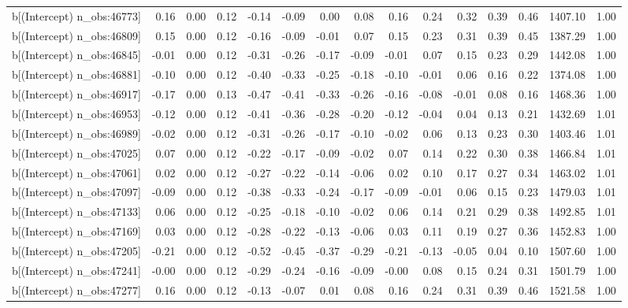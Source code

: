 \begin{table}[ht]
\begin{tabular}{rrrrrrrrrrrrrrr}
  b[(Intercept) n\_obs:46773] & 0.16 & 0.00 & 0.12 & -0.14 & -0.09 & 0.00 & 0.08 & 0.16 & 0.24 & 0.32 & 0.39 & 0.46 & 1407.10 & 1.00 \\ 
  b[(Intercept) n\_obs:46809] & 0.15 & 0.00 & 0.12 & -0.16 & -0.09 & -0.01 & 0.07 & 0.15 & 0.23 & 0.31 & 0.39 & 0.45 & 1387.29 & 1.00 \\ 
  b[(Intercept) n\_obs:46845] & -0.01 & 0.00 & 0.12 & -0.31 & -0.26 & -0.17 & -0.09 & -0.01 & 0.07 & 0.15 & 0.23 & 0.29 & 1442.08 & 1.00 \\ 
  b[(Intercept) n\_obs:46881] & -0.10 & 0.00 & 0.12 & -0.40 & -0.33 & -0.25 & -0.18 & -0.10 & -0.01 & 0.06 & 0.16 & 0.22 & 1374.08 & 1.00 \\ 
  b[(Intercept) n\_obs:46917] & -0.17 & 0.00 & 0.13 & -0.47 & -0.41 & -0.33 & -0.26 & -0.16 & -0.08 & -0.01 & 0.08 & 0.16 & 1468.36 & 1.00 \\ 
  b[(Intercept) n\_obs:46953] & -0.12 & 0.00 & 0.12 & -0.41 & -0.36 & -0.28 & -0.20 & -0.12 & -0.04 & 0.04 & 0.13 & 0.21 & 1432.69 & 1.01 \\ 
  b[(Intercept) n\_obs:46989] & -0.02 & 0.00 & 0.12 & -0.31 & -0.26 & -0.17 & -0.10 & -0.02 & 0.06 & 0.13 & 0.23 & 0.30 & 1403.46 & 1.01 \\ 
  b[(Intercept) n\_obs:47025] & 0.07 & 0.00 & 0.12 & -0.22 & -0.17 & -0.09 & -0.02 & 0.07 & 0.14 & 0.22 & 0.30 & 0.38 & 1466.84 & 1.01 \\ 
  b[(Intercept) n\_obs:47061] & 0.02 & 0.00 & 0.12 & -0.27 & -0.22 & -0.14 & -0.06 & 0.02 & 0.10 & 0.17 & 0.27 & 0.34 & 1463.02 & 1.01 \\ 
  b[(Intercept) n\_obs:47097] & -0.09 & 0.00 & 0.12 & -0.38 & -0.33 & -0.24 & -0.17 & -0.09 & -0.01 & 0.06 & 0.15 & 0.23 & 1479.03 & 1.01 \\ 
  b[(Intercept) n\_obs:47133] & 0.06 & 0.00 & 0.12 & -0.25 & -0.18 & -0.10 & -0.02 & 0.06 & 0.14 & 0.21 & 0.29 & 0.38 & 1492.85 & 1.01 \\ 
  b[(Intercept) n\_obs:47169] & 0.03 & 0.00 & 0.12 & -0.28 & -0.22 & -0.13 & -0.06 & 0.03 & 0.11 & 0.19 & 0.27 & 0.36 & 1452.83 & 1.00 \\ 
  b[(Intercept) n\_obs:47205] & -0.21 & 0.00 & 0.12 & -0.52 & -0.45 & -0.37 & -0.29 & -0.21 & -0.13 & -0.05 & 0.04 & 0.10 & 1507.60 & 1.00 \\ 
  b[(Intercept) n\_obs:47241] & -0.00 & 0.00 & 0.12 & -0.29 & -0.24 & -0.16 & -0.09 & -0.00 & 0.08 & 0.15 & 0.24 & 0.31 & 1501.79 & 1.00 \\ 
  b[(Intercept) n\_obs:47277] & 0.16 & 0.00 & 0.12 & -0.13 & -0.07 & 0.01 & 0.08 & 0.16 & 0.24 & 0.31 & 0.39 & 0.46 & 1521.58 & 1.00 \\ 

\end{tabular}
\end{table}
